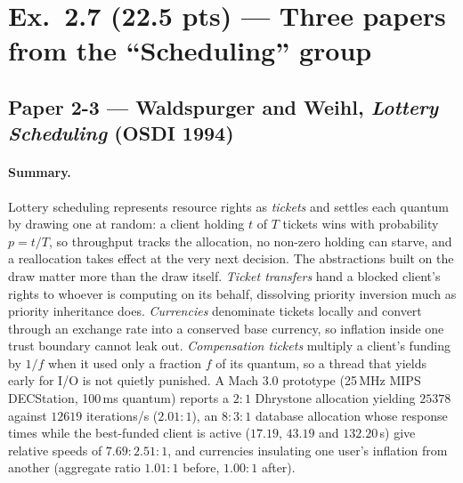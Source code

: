 \section*{Ex.~2.7 (22.5 pts) --- Three papers from the ``Scheduling'' group}

\subsection*{Paper 2-3 --- Waldspurger and Weihl, \emph{Lottery Scheduling} (OSDI 1994)}

\paragraph{Summary.}
Lottery scheduling represents resource rights as \emph{tickets} and settles each quantum by
drawing one at random: a client holding $t$ of $T$ tickets wins with probability $p = t/T$, so
throughput tracks the allocation, no non-zero holding can starve, and a reallocation takes effect
at the very next decision. The abstractions built on the draw matter more than the draw itself.
\emph{Ticket transfers} hand a blocked client's rights to whoever is computing on its
behalf, dissolving priority inversion much as priority inheritance does. \emph{Currencies}
denominate tickets locally and convert through an exchange rate into a conserved base currency,
so inflation inside one trust boundary cannot leak out. \emph{Compensation tickets} multiply a
client's funding by $1/f$ when it used only a fraction $f$ of its quantum, so a thread that
yields early for I/O is not quietly punished. A Mach 3.0 prototype (25\,MHz MIPS DECStation,
100\,ms quantum) reports a $2\!:\!1$ Dhrystone allocation yielding $25378$ against $12619$
iterations/s ($2.01\!:\!1$), an $8\!:\!3\!:\!1$ database allocation whose response times while the
best-funded client is active ($17.19$, $43.19$ and $132.20$\,s) give relative speeds of
$7.69\!:\!2.51\!:\!1$, and currencies insulating one user's
inflation from another (aggregate ratio $1.01\!:\!1$ before, $1.00\!:\!1$ after).

